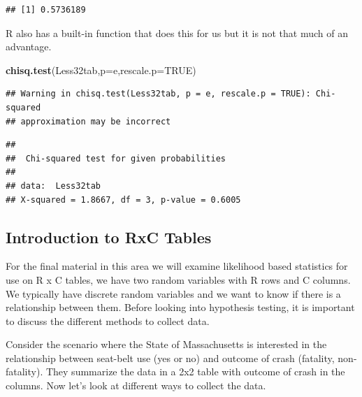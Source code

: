 \documentclass[]{book}
\newenvironment{Shaded}{\begin{snugshade}}{\end{snugshade}}
\newcommand{\KeywordTok}[1]{\textcolor[rgb]{0.13,0.29,0.53}{\textbf{#1}}}
\newcommand{\DataTypeTok}[1]{\textcolor[rgb]{0.13,0.29,0.53}{#1}}
\newcommand{\OtherTok}[1]{\textcolor[rgb]{0.56,0.35,0.01}{#1}}
\newcommand{\NormalTok}[1]{#1}
\theoremstyle{definition}
\theoremstyle{definition}
\theoremstyle{definition}
\theoremstyle{remark}
\begin{document}
\begin{verbatim}
## [1] 0.5736189
\end{verbatim}

R also has a built-in function that does this for us but it is not that
much of an advantage.

\begin{Shaded}
\begin{Highlighting}[]
\KeywordTok{chisq.test}\NormalTok{(Less32tab,}\DataTypeTok{p=}\NormalTok{e,}\DataTypeTok{rescale.p=}\OtherTok{TRUE}\NormalTok{)}
\end{Highlighting}
\end{Shaded}

\begin{verbatim}
## Warning in chisq.test(Less32tab, p = e, rescale.p = TRUE): Chi-squared
## approximation may be incorrect
\end{verbatim}

\begin{verbatim}
## 
##  Chi-squared test for given probabilities
## 
## data:  Less32tab
## X-squared = 1.8667, df = 3, p-value = 0.6005
\end{verbatim}

\subsection{Introduction to RxC
Tables}\label{introduction-to-rxc-tables}

For the final material in this area we will examine likelihood based
statistics for use on R x C tables, we have two random variables with R
rows and C columns. We typically have discrete random variables and we
want to know if there is a relationship between them. Before looking
into hypothesis testing, it is important to discuss the different
methods to collect data.

Consider the scenario where the State of Massachusetts is interested in
the relationship between seat-belt use (yes or no) and outcome of crash
(fatality, non-fatality). They summarize the data in a 2x2 table with
outcome of crash in the columns. Now let's look at different ways to
collect the data.
\end{document}
